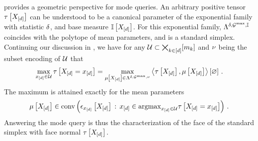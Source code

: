  provides a geometric perspective for mode queries.
An arbitrary positive tensor $\tau\left[X_{[d]}\right]$ can be understood to be a canonical parameter of the exponential family with statistic $\delta$, and base measure $\mathbb{I}\left[X_{[d]}\right]$.
For this exponential family, $\Lambda^{\delta,\mathcal{G}^{\mathrm{max}},\mathbb{I}}$ coincides with the polytope of mean parameters, and is a standard simplex.
Continuing our discussion in , we have for any $\mathcal{U}\subset\bigtimes_{k\in[d]}[m_{k}]$ and $\nu$ being the subset encoding of $\mathcal{U}$ that
\begin{align*}
    \max_{x_{[d]}\in\mathcal{U}} \tau\left[X_{[d]}=x_{[d]}\right] =
    \max_{\mu\left[X_{[d]}\right]\in\Lambda^{\delta,\mathcal{G}^{\mathrm{max}},\nu}} \left\langle \tau\left[X_{[d]}\right],\mu\left[X_{[d]}\right]\right\rangle \left[ \varnothing \right] \, .
\end{align*}
The maximum is attained exactly for the mean parameters
\begin{align*}
    \mu\left[X_{[d]}\right]\in
    \mathrm{conv}\left(\epsilon_{x_{[d]}}\left[X_{[d]}\right] \, : \, x_{[d]}\in\mathrm{argmax}_{x_{[d]}\in\mathcal{U}} \tau\left[X_{[d]}=x_{[d]}\right]\right) \, .
\end{align*}
Answering the mode query is thus the characterization of the face of the standard simplex with face normal $\tau\left[X_{[d]}\right]$.

